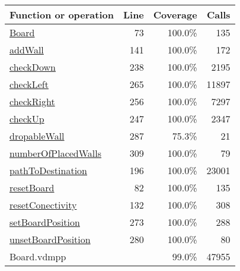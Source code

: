 \begin{longtable}{|l|r|r|r|}
\hline
Function or operation & Line & Coverage & Calls \\
\hline
\hline
\hyperref[Board:73]{Board} & 73&100.0\% & 135 \\
\hline
\hyperref[addWall:141]{addWall} & 141&100.0\% & 172 \\
\hline
\hyperref[checkDown:238]{checkDown} & 238&100.0\% & 2195 \\
\hline
\hyperref[checkLeft:265]{checkLeft} & 265&100.0\% & 11897 \\
\hline
\hyperref[checkRight:256]{checkRight} & 256&100.0\% & 7297 \\
\hline
\hyperref[checkUp:247]{checkUp} & 247&100.0\% & 2347 \\
\hline
\hyperref[dropableWall:287]{dropableWall} & 287&75.3\% & 21 \\
\hline
\hyperref[numberOfPlacedWalls:309]{numberOfPlacedWalls} & 309&100.0\% & 79 \\
\hline
\hyperref[pathToDestination:196]{pathToDestination} & 196&100.0\% & 23001 \\
\hline
\hyperref[resetBoard:82]{resetBoard} & 82&100.0\% & 135 \\
\hline
\hyperref[resetConectivity:132]{resetConectivity} & 132&100.0\% & 308 \\
\hline
\hyperref[setBoardPosition:273]{setBoardPosition} & 273&100.0\% & 288 \\
\hline
\hyperref[unsetBoardPosition:280]{unsetBoardPosition} & 280&100.0\% & 80 \\
\hline
\hline
Board.vdmpp & & 99.0\% & 47955 \\
\hline
\end{longtable}

